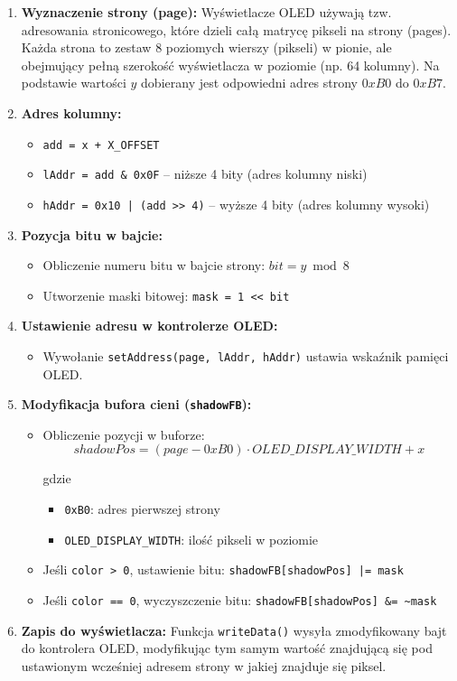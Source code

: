 \documentclass[letterpaper,11pt]{report}
\begin{document}
\begin{enumerate}
    \item \textbf{Wyznaczenie strony (page):} Wyświetlacze OLED używają tzw. adresowania stronicowego, które dzieli całą matrycę pikseli na strony (pages). Każda strona to zestaw 8 poziomych wierszy (pikseli) w pionie, ale obejmujący pełną szerokość wyświetlacza w poziomie (np. 64 kolumny). Na podstawie wartości $y$ dobierany jest odpowiedni adres strony $0xB0$ do $0xB7$.
    \item \textbf{Adres kolumny:}
      \begin{itemize}
          \item \texttt{add = x + X\_OFFSET}
          \item \texttt{lAddr = add \& 0x0F} – niższe 4 bity (adres kolumny niski)
          \item \texttt{hAddr = 0x10 | (add >> 4)} – wyższe 4 bity (adres kolumny wysoki)
      \end{itemize}
    \item \textbf{Pozycja bitu w bajcie:}
      \begin{itemize}
          \item Obliczenie numeru bitu w bajcie strony: $bit = y \bmod 8$
          \item Utworzenie maski bitowej: \texttt{mask = 1 << bit}
      \end{itemize}
    \item \textbf{Ustawienie adresu w kontrolerze OLED:}
      \begin{itemize}
          \item Wywołanie \texttt{setAddress(page, lAddr, hAddr)} ustawia wskaźnik pamięci OLED.
      \end{itemize}
    \item \textbf{Modyfikacja bufora cieni (\texttt{shadowFB}):}
      \begin{itemize}
          \item Obliczenie pozycji w buforze: 
          \[
          shadowPos = (page - 0xB0) \cdot OLED\_DISPLAY\_WIDTH + x
          \]

          gdzie 
          \begin{itemize}
            \item \texttt{0xB0}: adres pierwszej strony
            \item \texttt{OLED\_DISPLAY\_WIDTH}: ilość pikseli w poziomie
          \end{itemize}
          \item Jeśli \texttt{color > 0}, ustawienie bitu: \texttt{shadowFB[shadowPos] |= mask}
          \item Jeśli \texttt{color == 0}, wyczyszczenie bitu: \texttt{shadowFB[shadowPos] \&= \textasciitilde mask}
      \end{itemize}
    \item \textbf{Zapis do wyświetlacza:} Funkcja \texttt{writeData()} wysyła zmodyfikowany bajt do kontrolera OLED, modyfikując tym samym wartość znajdującą się pod ustawionym wcześniej adresem strony w jakiej znajduje się piksel.
  \end{enumerate}
  \vspace{10pt}
\end{document}
